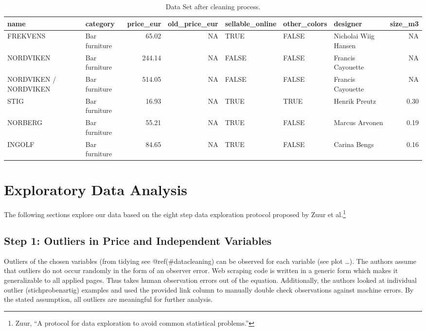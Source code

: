 \documentclass[a4paper, nobind]{templates/ociamthesis}
\begin{document}
\begin{table}

\caption{\label{tab:tidy-ikea}Data Set after cleaning process.}
\centering
\begin{tabular}[t]{l|l|r|r|l|l|l|r}
\hline
name & category & price\_eur & old\_price\_eur & sellable\_online & other\_colors & designer & size\_m3\\
\hline
FREKVENS & Bar furniture & 65.02 & NA & TRUE & FALSE & Nicholai Wiig Hansen & NA\\
\hline
NORDVIKEN & Bar furniture & 244.14 & NA & FALSE & FALSE & Francis Cayouette & NA\\
\hline
NORDVIKEN / NORDVIKEN & Bar furniture & 514.05 & NA & FALSE & FALSE & Francis Cayouette & NA\\
\hline
STIG & Bar furniture & 16.93 & NA & TRUE & TRUE & Henrik Preutz & 0.30\\
\hline
NORBERG & Bar furniture & 55.21 & NA & TRUE & FALSE & Marcus Arvonen & 0.19\\
\hline
INGOLF & Bar furniture & 84.65 & NA & TRUE & FALSE & Carina Bengs & 0.16\\
\hline
\end{tabular}
\end{table}

\hypertarget{tbd}{%
\section{Exploratory Data Analysis}\label{tbd}}

The following sections explore our data based on the eight step data exploration protocol proposed by Zuur et al.\footnote{Zuur, ``A protocol for data exploration to avoid common statistical problems.''}

\hypertarget{step-1-outliers-in-price-and-independent-variables}{%
\subsection{Step 1: Outliers in Price and Independent Variables}\label{step-1-outliers-in-price-and-independent-variables}}

Outliers of the chosen variables (from tidying see @ref(\#datacleaning) can be observed for each variable (see plot \ldots{}).
The authors assume that outliers do not occur randomly in the form of an observer error. Web scraping code is written in a generic form which makes it generalizable to all applied pages. Thus takes human observation errors out of the equation. Additionally, the authors looked at individual outlier (stichprobenartig) examples and used the provided link column to manually double check observations against machine errors.
By the stated assumption, all outliers are meaningful for further analysis.
\end{document}
